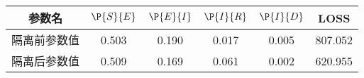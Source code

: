 \begin{tabular}{cccccc}
\hline
参数名&$\P{S}{E}$&$\P{E}{I}$&$\P{I}{R}$&$\P{I}{D}$&LOSS\\
\hline
隔离前参数值&0.503&0.190&0.017&0.005&807.052\\
隔离后参数值&0.509&0.169&0.061&0.002&620.955\\
\hline
\end{tabular}